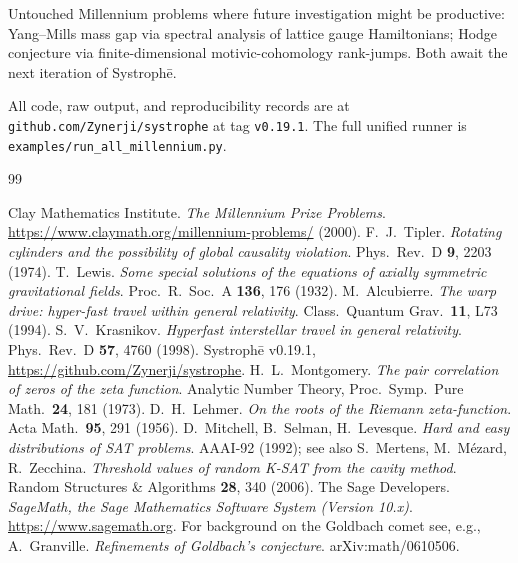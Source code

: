\documentclass[11pt,letterpaper]{article}
\newcommand{\Systrophe}{Systroph\=e}
\begin{document}
Untouched Millennium problems where future investigation might be productive: Yang--Mills mass gap via spectral analysis of lattice gauge Hamiltonians; Hodge conjecture via finite-dimensional motivic-cohomology rank-jumps. Both await the next iteration of \Systrophe.

All code, raw output, and reproducibility records are at \texttt{github.com/Zynerji/systrophe} at tag \texttt{v0.19.1}. The full unified runner is \texttt{examples/run\_all\_millennium.py}.

\begin{thebibliography}{99}

 Clay Mathematics Institute. \emph{The Millennium Prize Problems}. \url{https://www.claymath.org/millennium-problems/} (2000).
 F.~J.~Tipler. \emph{Rotating cylinders and the possibility of global causality violation}. Phys.\ Rev.\ D \textbf{9}, 2203 (1974).
 T.~Lewis. \emph{Some special solutions of the equations of axially symmetric gravitational fields}. Proc.\ R.\ Soc.\ A \textbf{136}, 176 (1932).
 M.~Alcubierre. \emph{The warp drive: hyper-fast travel within general relativity}. Class.\ Quantum Grav.\ \textbf{11}, L73 (1994).
 S.~V.~Krasnikov. \emph{Hyperfast interstellar travel in general relativity}. Phys.\ Rev.\ D \textbf{57}, 4760 (1998).
 \Systrophe{} v0.19.1, \url{https://github.com/Zynerji/systrophe}.
 H.~L.~Montgomery. \emph{The pair correlation of zeros of the zeta function}. Analytic Number Theory, Proc.\ Symp.\ Pure Math.\ \textbf{24}, 181 (1973).
 D.~H.~Lehmer. \emph{On the roots of the Riemann zeta-function}. Acta Math.\ \textbf{95}, 291 (1956).
 D.~Mitchell, B.~Selman, H.~Levesque. \emph{Hard and easy distributions of SAT problems}. AAAI-92 (1992); see also S.~Mertens, M.~M\'ezard, R.~Zecchina. \emph{Threshold values of random K-SAT from the cavity method}. Random Structures \& Algorithms \textbf{28}, 340 (2006).
 The Sage Developers. \emph{SageMath, the Sage Mathematics Software System (Version 10.x)}. \url{https://www.sagemath.org}.
 For background on the Goldbach comet see, e.g., A.~Granville. \emph{Refinements of Goldbach's conjecture}. arXiv:math/0610506.

\end{thebibliography}
\end{document}
